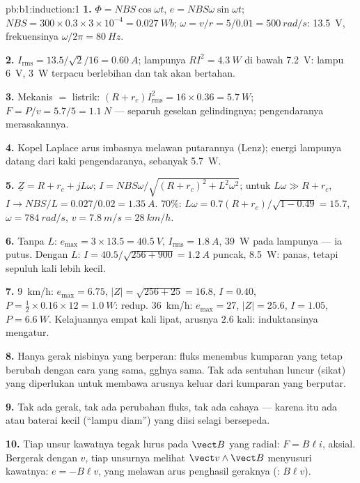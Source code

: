 \begin{solution}{pb:b1:induction:1}
\textbf{1.} $\Phi = NBS\cos\omega t$, $e = NBS\omega\sin\omega t$; $NBS = 300 \times
0.3 \times 3 \times 10^{-4} = \qty{0.027}{Wb}$; $\omega = v/r = 5/0.01 = \qty{500}{rad/s}$:
 \qty{13.5}{V}, frekuensinya $\omega/2\pi = \qty{80}{Hz}$.

\textbf{2.} $I_{\text{rms}} = 13.5/\sqrt2/16 = \qty{0.60}{A}$; lampunya $RI^2 = \qty{4.3}{W}$
di bawah \qty{7.2}{V}: lampu \qty{6}{V}, \qty{3}{W} terpacu berlebihan dan tak akan
bertahan.

\textbf{3.} Mekanis $=$ listrik: $(R + r_c)I_{\text{rms}}^2 = 16 \times 0.36 =
\qty{5.7}{W}$; $F = P/v = 5.7/5 = \qty{1.1}{N}$ --- separuh gesekan gelindingnya;
pengendaranya merasakannya.

\textbf{4.} Kopel Laplace arus imbasnya melawan putarannya
(Lenz); energi lampunya datang dari kaki pengendaranya, sebanyak \qty{5.7}{W}.

\textbf{5.} $\underline Z = R + r_c + jL\omega$; $I = NBS\omega/\sqrt{(R + r_c)^2 + L^2\omega^2}$;
untuk $L\omega \gg R + r_c$, $I \to NBS/L = 0.027/0.02 = \qty{1.35}{A}$. $70\%$: $L\omega
= 0.7(R + r_c)/\sqrt{1 - 0.49} = 15.7$, $\omega = \qty{784}{rad/s}$, $v = \qty{7.8}{m/s}
= \qty{28}{km/h}$.

\textbf{6.} Tanpa $L$: $e_{\max} = 3 \times 13.5 = \qty{40.5}{V}$, $I_{\text{rms}} =
\qty{1.8}{A}$, \qty{39}{W} pada lampunya --- ia putus. Dengan $L$: $I = 40.5/\sqrt{256 +
900} = \qty{1.2}{A}$ puncak, \qty{8.5}{W}: panas, tetapi sepuluh kali lebih kecil.

\textbf{7.} \qty{9}{km/h}: $e_{\max} = 6.75$, $|Z| = \sqrt{256 + 25} = 16.8$, $I = 0.40$,
$P = \tfrac12 \times 0.16 \times 12 = \qty{1.0}{W}$: redup. \qty{36}{km/h}: $e_{\max} = 27$,
$|Z| = 25.6$, $I = 1.05$, $P = \qty{6.6}{W}$. Kelajuannya empat kali lipat, arusnya $2.6$ kali:
induktansinya mengatur.

\textbf{8.} Hanya gerak nisbinya yang berperan: fluks menembus kumparan
yang tetap berubah dengan cara yang sama, gglnya sama. Tak ada sentuhan luncur (sikat) yang
diperlukan untuk membawa arusnya keluar dari kumparan yang berputar.

\textbf{9.} Tak ada gerak, tak ada perubahan fluks, tak ada cahaya --- karena itu ada  atau
baterai kecil (``lampu diam'') yang diisi selagi bersepeda.

\textbf{10.} Tiap unsur kawatnya tegak lurus pada $\vect B$ yang radial:
$F = B\ell i$, aksial. Bergerak dengan $v$, tiap unsurnya melihat $\vect v\wedge\vect B$
menyusuri kawatnya: $e = -B\ell v$, yang melawan arus penghasil
geraknya (:  $B\ell v$).


\end{solution}

